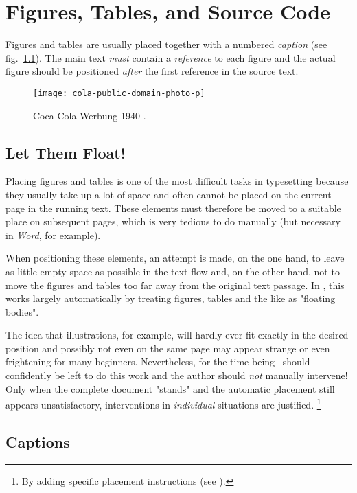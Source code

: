 \chapter{Figures, Tables, and Source Code}
\label{cha:Figures}


Figures and tables are usually placed together with a numbered \emph{caption}
(see fig.~\ref{fig:CocaCola}). The main text \emph{must} contain a
\emph{reference} to each figure and the actual figure should be positioned
\emph{after} the first reference in the \latex source text.

\begin{figure}
    \centering
    \texttt{[image: cola-public-domain-photo-p]} %
    \caption{Coca-Cola Werbung 1940 \cite{CocaCola1940}.}
    \label{fig:CocaCola}
\end{figure}


\section{Let Them Float!}

Placing figures and tables is one of the most difficult tasks in typesetting
because they usually take up a lot of space and often cannot be placed on the
current page in the running text. These elements must therefore be moved to a
suitable place on subsequent pages, which is very tedious to do manually (but
necessary in \emph{Word}, for example).

When positioning these elements, an attempt is made, on the one hand, to
leave as little empty space as possible in the text flow and, on the other
hand, not to move the figures and tables too far away from the original text
passage. In \latex, this works largely automatically by treating figures,
tables and the like as "floating bodies".

The idea that illustrations, for example, will hardly ever fit exactly in the
desired position and possibly not even on the same page may appear strange or
even frightening for many beginners. Nevertheless, for the time being \latex\
should confidently be left to do this work and the author should \emph{not}
manually intervene! Only when the complete document "stands" and the
automatic placement still appears unsatisfactory, interventions in
\emph{individual} situations are justified.%
\footnote{By adding specific placement instructions (see
\cite[p.~39]{Oetiker2021}).}


\section{Captions}

